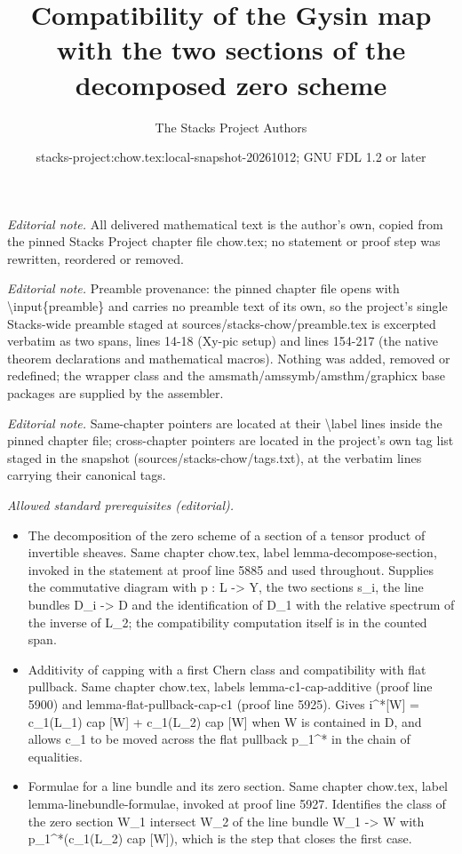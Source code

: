 \documentclass[10pt,a4paper]{amsart}
\title{Compatibility of the Gysin map with the two sections of the decomposed zero scheme}
\author{The Stacks Project Authors}
\date{stacks-project:chow.tex:local-snapshot-20261012; GNU FDL 1.2 or later}
\theoremstyle{plain}
\theoremstyle{definition}
\theoremstyle{remark}
\numberwithin{equation}{subsection}
\begin{document}
\maketitle
\noindent\textit{Editorial note.} All delivered mathematical text is the author's own, copied from the pinned Stacks Project chapter file chow.tex; no statement or proof step was rewritten, reordered or removed.\par\medskip
\noindent\textit{Editorial note.} Preamble provenance: the pinned chapter file opens with \textbackslash{}input\{preamble\} and carries no preamble text of its own, so the project's single Stacks-wide preamble staged at sources/stacks-chow/preamble.tex is excerpted verbatim as two spans, lines 14-18 (Xy-pic setup) and lines 154-217 (the native theorem declarations and mathematical macros). Nothing was added, removed or redefined; the wrapper class and the amsmath/amssymb/amsthm/graphicx base packages are supplied by the assembler.\par\medskip
\noindent\textit{Editorial note.} Same-chapter pointers are located at their \textbackslash{}label lines inside the pinned chapter file; cross-chapter pointers are located in the project's own tag list staged in the snapshot (sources/stacks-chow/tags.txt), at the verbatim lines carrying their canonical tags.\par\medskip
\noindent\textit{Allowed standard prerequisites (editorial).}\begin{itemize}
\item The decomposition of the zero scheme of a section of a tensor product of invertible sheaves. Same chapter chow.tex, label lemma-decompose-section, invoked in the statement at proof line 5885 and used throughout. Supplies the commutative diagram with p : L -> Y, the two sections s\_i, the line bundles D\_i -> D and the identification of D\_1 with the relative spectrum of the inverse of L\_2; the compatibility computation itself is in the counted span.
\item Additivity of capping with a first Chern class and compatibility with flat pullback. Same chapter chow.tex, labels lemma-c1-cap-additive (proof line 5900) and lemma-flat-pullback-cap-c1 (proof line 5925). Gives i\textasciicircum{}*[W] = c\_1(L\_1) cap [W] + c\_1(L\_2) cap [W] when W is contained in D, and allows c\_1 to be moved across the flat pullback p\_1\textasciicircum{}* in the chain of equalities.
\item Formulae for a line bundle and its zero section. Same chapter chow.tex, label lemma-linebundle-formulae, invoked at proof line 5927. Identifies the class of the zero section W\_1 intersect W\_2 of the line bundle W\_1 -> W with p\_1\textasciicircum{}*(c\_1(L\_2) cap [W]), which is the step that closes the first case.
\end{itemize}\medskip
\end{document}
